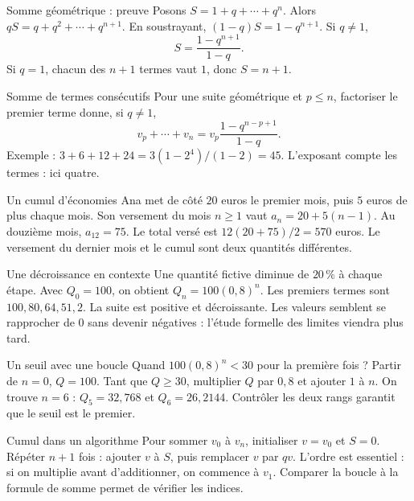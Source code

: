 \documentclass[aspectratio=169,12pt]{beamer}
\begin{document}
\renewcommand{\slidekind}{JUSTIFIER}
\begin{frame}[t,fragile]{Somme géométrique : preuve}
Posons $S=1+q+\cdots+q^n$. Alors $qS=q+q^2+\cdots+q^{n+1}$. En soustrayant, $(1-q)S=1-q^{n+1}$. Si $q\ne1$, \[S=\frac{1-q^{n+1}}{1-q}.\] Si $q=1$, chacun des $n+1$ termes vaut $1$, donc $S=n+1$.
\end{frame}
\renewcommand{\slidekind}{COMPRENDRE}
\begin{frame}[t,fragile]{Somme de termes consécutifs}
Pour une suite géométrique et $p\le n$, factoriser le premier terme donne, si $q\ne1$, \[v_p+\cdots+v_n=v_p\frac{1-q^{n-p+1}}{1-q}.\] Exemple : $3+6+12+24=3(1-2^4)/(1-2)=45$. L’exposant compte les termes : ici quatre.
\end{frame}
\renewcommand{\slidekind}{COMPRENDRE}
\begin{frame}[t,fragile]{Un cumul d’économies}
Ana met de côté $20$ euros le premier mois, puis $5$ euros de plus chaque mois. Son versement du mois $n\ge1$ vaut $a_n=20+5(n-1)$. Au douzième mois, $a_{12}=75$. Le total versé est $12(20+75)/2=570$ euros. Le versement du dernier mois et le cumul sont deux quantités différentes.
\end{frame}
\renewcommand{\slidekind}{COMPRENDRE}
\begin{frame}[t,fragile]{Une décroissance en contexte}
Une quantité fictive diminue de $20\,\%$ à chaque étape. Avec $Q_0=100$, on obtient $Q_n=100(0,8)^n$. Les premiers termes sont $100,80,64,51,2$. La suite est positive et décroissante. Les valeurs semblent se rapprocher de $0$ sans devenir négatives : l’étude formelle des limites viendra plus tard.
\end{frame}
\renewcommand{\slidekind}{COMPRENDRE}
\begin{frame}[t,fragile]{Un seuil avec une boucle}
Quand $100(0,8)^n<30$ pour la première fois ? Partir de $n=0$, $Q=100$. Tant que $Q\ge30$, multiplier $Q$ par $0,8$ et ajouter $1$ à $n$. On trouve $n=6$ : $Q_5=32,768$ et $Q_6=26,2144$. Contrôler les deux rangs garantit que le seuil est le premier.
\end{frame}
\renewcommand{\slidekind}{COMPRENDRE}
\begin{frame}[t,fragile]{Cumul dans un algorithme}
Pour sommer $v_0$ à $v_n$, initialiser $v=v_0$ et $S=0$. Répéter $n+1$ fois : ajouter $v$ à $S$, puis remplacer $v$ par $qv$. L’ordre est essentiel : si on multiplie avant d’additionner, on commence à $v_1$. Comparer la boucle à la formule de somme permet de vérifier les indices.
\end{frame}
\end{document}
